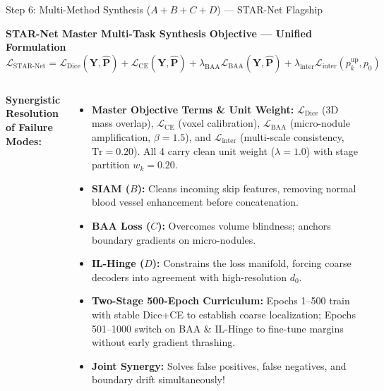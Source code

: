 \documentclass[aspectratio=169, 10pt]{beamer}
\begin{document}
\begin{frame}{Step 6: Multi-Method Synthesis ($A + B + C + D$) --- STAR-Net Flagship}
  \begin{block}{\small \textbf{STAR-Net Master Multi-Task Synthesis Objective --- Unified Formulation}}
    \centering
    $\mathcal{L}_{\text{STAR-Net}} = \mathcal{L}_{\text{Dice}}(\mathbf{Y}, \hat{\mathbf{P}}) + \mathcal{L}_{\text{CE}}(\mathbf{Y}, \hat{\mathbf{P}}) + \lambda_{\text{BAA}} \mathcal{L}_{\text{BAA}}(\mathbf{Y}, \hat{\mathbf{P}}) + \lambda_{\text{inter}} \mathcal{L}_{\text{inter}}(p_k^{\text{up}}, p_0)$
    
    \vspace{2pt}
  \end{block}
  
  \vspace{0.15cm}
  \begin{columns}[T]
    \textbf{Synergistic Resolution of Failure Modes:}
    \begin{itemize}\itemsep=3pt
      \scriptsize
      \item \textbf{Master Objective Terms \& Unit Weight:} $\mathcal{L}_{\text{Dice}}$ (3D mass overlap), $\mathcal{L}_{\text{CE}}$ (voxel calibration), $\mathcal{L}_{\text{BAA}}$ (micro-nodule amplification, $\beta=1.5$), and $\mathcal{L}_{\text{inter}}$ (multi-scale consistency, $\text{Tr}=0.20$). All 4 carry clean unit weight ($\lambda=1.0$) with stage partition $w_k=0.20$.
      \item \textbf{SIAM ($B$):} Cleans incoming skip features, removing normal blood vessel enhancement before concatenation.
      \item \textbf{BAA Loss ($C$):} Overcomes volume blindness; anchors boundary gradients on micro-nodules.
      \item \textbf{IL-Hinge ($D$):} Constrains the loss manifold, forcing coarse decoders into agreement with high-resolution $d_0$.
      \item \textbf{Two-Stage 500-Epoch Curriculum:} Epochs 1--500 train with stable Dice+CE to establish coarse localization; Epochs 501--1000 switch on BAA \& IL-Hinge to fine-tune margins without early gradient thrashing.
      \item \textbf{Joint Synergy:} Solves false positives, false negatives, and boundary drift simultaneously!
    \end{itemize}
    

\end{columns}
\end{frame}
\end{document}
